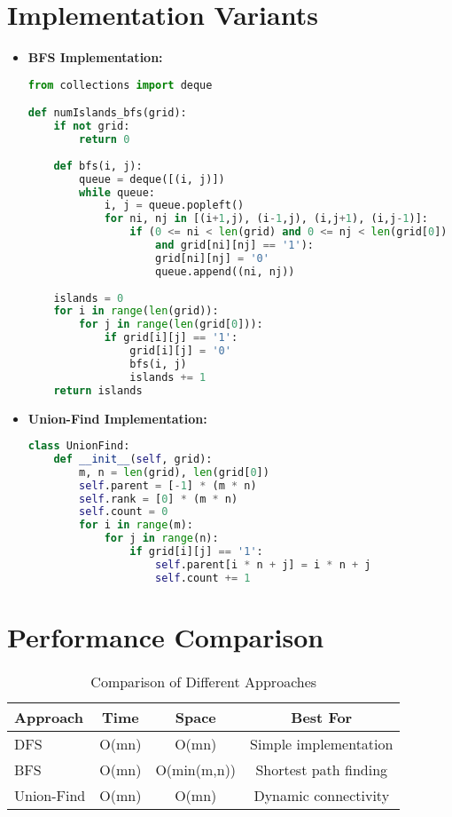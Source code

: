 \section*{Implementation Variants}
\begin{itemize}
    \item \textbf{BFS Implementation:}
    \begin{lstlisting}[language=Python]
from collections import deque

def numIslands_bfs(grid):
    if not grid:
        return 0
        
    def bfs(i, j):
        queue = deque([(i, j)])
        while queue:
            i, j = queue.popleft()
            for ni, nj in [(i+1,j), (i-1,j), (i,j+1), (i,j-1)]:
                if (0 <= ni < len(grid) and 0 <= nj < len(grid[0]) 
                    and grid[ni][nj] == '1'):
                    grid[ni][nj] = '0'
                    queue.append((ni, nj))
    
    islands = 0
    for i in range(len(grid)):
        for j in range(len(grid[0])):
            if grid[i][j] == '1':
                grid[i][j] = '0'
                bfs(i, j)
                islands += 1
    return islands
    \end{lstlisting}

    \item \textbf{Union-Find Implementation:}
    \begin{lstlisting}[language=Python]
class UnionFind:
    def __init__(self, grid):
        m, n = len(grid), len(grid[0])
        self.parent = [-1] * (m * n)
        self.rank = [0] * (m * n)
        self.count = 0
        for i in range(m):
            for j in range(n):
                if grid[i][j] == '1':
                    self.parent[i * n + j] = i * n + j
                    self.count += 1
    \end{lstlisting}
\end{itemize}

\section*{Performance Comparison}
\begin{table}[h]
    \centering
    \begin{tabular}{|l|c|c|c|}
        \hline
        \textbf{Approach} & \textbf{Time} & \textbf{Space} & \textbf{Best For} \\
        \hline
        DFS & O(mn) & O(mn) & Simple implementation \\
        BFS & O(mn) & O(min(m,n)) & Shortest path finding \\
        Union-Find & O(mn) & O(mn) & Dynamic connectivity \\
        \hline
    \end{tabular}
    \caption{Comparison of Different Approaches}
    \label{table:approach_comparison}
\end{table}

